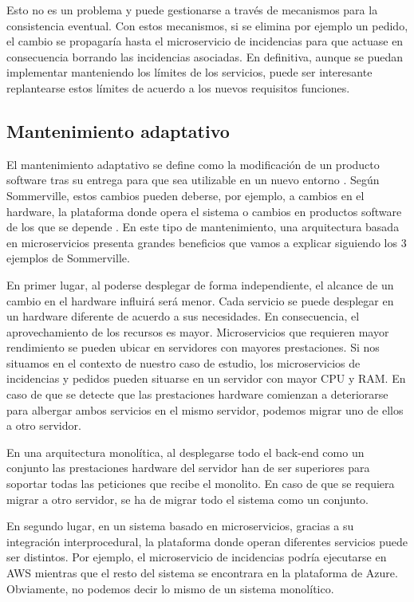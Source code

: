 \documentclass[11pt,spanish,listoffigures]{tfgetsinf}
\begin{document}
Esto no es un problema y puede gestionarse a través de mecanismos para la consistencia eventual. Con estos mecanismos, si se elimina por ejemplo un pedido, el cambio se propagaría hasta el microservicio de incidencias para que actuase en consecuencia borrando las incidencias asociadas. En definitiva, aunque se puedan implementar manteniendo los límites de los servicios, puede ser interesante replantearse estos límites de acuerdo a los nuevos requisitos funciones.

\subsection{Mantenimiento adaptativo}

El mantenimiento adaptativo se define como la modificación de un producto software tras su entrega para que sea utilizable en un nuevo entorno \cite{Bourque2014}. Según Sommerville, estos cambios pueden deberse, por ejemplo, a cambios en el hardware, la plataforma donde opera el sistema o cambios en productos software de los que se depende \cite{Sommerville2010}. En este tipo de mantenimiento, una arquitectura basada en microservicios presenta grandes beneficios que vamos a explicar siguiendo los 3 ejemplos de Sommerville.

En primer lugar, al poderse desplegar de forma independiente, el alcance de un cambio en el hardware influirá será menor. Cada servicio se puede desplegar en un hardware diferente de acuerdo a sus necesidades. En consecuencia, el aprovechamiento de los recursos es mayor. Microservicios que requieren mayor rendimiento se pueden ubicar en servidores con mayores prestaciones. Si nos situamos en el contexto de nuestro caso de estudio, los microservicios de incidencias y pedidos pueden situarse en un servidor con mayor CPU y RAM. En caso de que se detecte que las prestaciones hardware comienzan a deteriorarse para albergar ambos servicios en el mismo servidor, podemos migrar uno de ellos a otro servidor. 

En una arquitectura monolítica, al desplegarse todo el back-end como un conjunto las prestaciones hardware del servidor han de ser superiores para soportar todas las peticiones que recibe el monolito. En caso de que se requiera migrar a otro servidor, se ha de migrar todo el sistema como un conjunto.

En segundo lugar, en un sistema basado en microservicios, gracias a su integración interprocedural, la plataforma donde operan diferentes servicios puede ser distintos. Por ejemplo, el microservicio de incidencias podría ejecutarse en AWS mientras que el resto del sistema se encontrara en la plataforma de Azure. Obviamente, no podemos decir lo mismo de un sistema monolítico.
\end{document}
